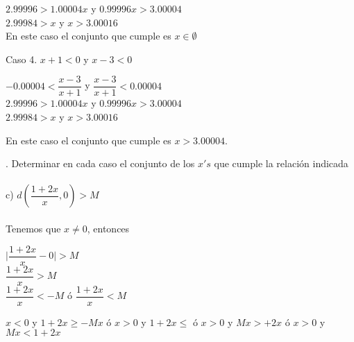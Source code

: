 \documentclass[12pt,a4paper,scrartcl]{article}
\begin{document}
{\begin{center}
$2.99996>1.00004x$ y $0.99996x>3.00004$\\\vspace{1em}
$2.99984>x$ y $x>3.00016$\\\vspace{1em}
En este caso el conjunto que cumple es $x\in\emptyset$\\
\end{center}
Caso 4. $x+1<0$ y $x-3<0$\\
\begin{center}
$-0.00004<\dfrac{x-3}{x+1}$ y $\dfrac{x-3}{x+1}< 0.00004$\\\vspace{1em}
$2.99996>1.00004x$ y $0.99996x>3.00004$\\\vspace{1em}
$2.99984>x$ y $x>3.00016$\\\vspace{1em}
\begin{flushleft}
En este caso el conjunto que cumple es $x>3.00004$.\\
\end{flushleft}
\end{center}




. Determinar en cada caso el conjunto de los $x's$ que cumple la relaci\'on indicada\\
\\c) $d ( \dfrac{1+2x}{x},0)>M$\\
\\Tenemos que $x\neq 0$, entonces\\
\begin{center}

$\lvert \dfrac{1+2x}{x}-0\lvert > M$\\
$\dfrac{1+2x}{x}>M$\\
$\dfrac{1+2x}{x}<-M$ \'o $\dfrac{1+2x}{x}<M$\\\vspace{1em}

\end{center}

$x<0$ y $1+2x\geq-Mx$ \hspace{1em}\'o \hspace{1em} $x>0$ y $1+2x\leq$ \hspace{1em}\'o \hspace{1em} $x>0$ y $Mx>+2x$ \hspace{1em}\'o \hspace{1em} $x>0$ y $Mx<1+2x$\\

}
\end{document}
